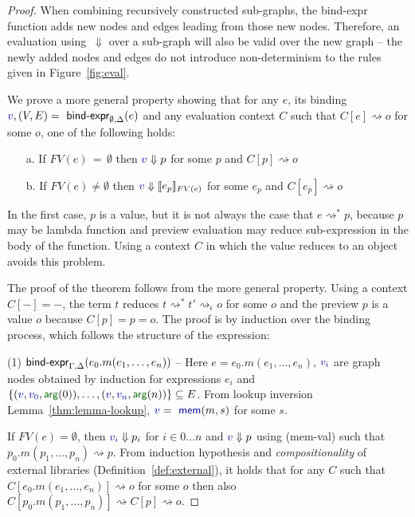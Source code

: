 \documentclass[english,submission]{programming}
\theoremstyle{plain}
\theoremstyle{definition}
\newcommand{\ident}[1]{\textnormal{\textcolor{idclr}{\sffamily #1}}}
\newcommand{\bndclr}[1]{\textcolor{kvdclr}{#1}}
\newcommand{\bnd}[1]{\textnormal{\textcolor{kvdclr}{\sffamily #1}}}
\newcommand{\blbl}[1]{\textnormal{\textcolor{numclr}{\sffamily #1}}}
\newcommand{\rname}[1]{{\sffamily(#1)}}
\begin{document}
\begin{proof}
When combining recursively constructed sub-graphs, the \ident{bind-expr} function
adds new nodes and edges leading from those new nodes. Therefore, an evaluation using~$\Downarrow$
over a sub-graph will also be valid over the new graph -- the newly added nodes and edges do not introduce
non-determinism to the rules given in Figure~\ref{fig:eval}.

We prove a more general property showing that for any $e$, its binding
$\bndclr{v}, (V, E) = \ident{bind-expr}_{\emptyset, \Delta}(e)$ and any evaluation context $C$
such that $C[e]\rightsquigarrow o$ for some $o$, one of the following holds:
%
\begin{enumerate}
\item[a.] If $FV(e)\,=\,\emptyset$ then $\bndclr{v} \Downarrow p$ for some $p$ and $C[p] \rightsquigarrow o$
\item[b.] If $FV(e)\neq\emptyset$ then $\bndclr{v} \Downarrow \llbracket e_p \rrbracket_{FV(e)}$ for some $e_p$ and $C[e_p] \rightsquigarrow o$
\end{enumerate}
%
In the first case, $p$ is a value, but it is not always the case that $e \rightsquigarrow^{*} p$,
because $p$ may be lambda function and preview evaluation may reduce sub-expression in the body of
the function. Using a context $C$ in which the value reduces to an object avoids this problem.

The proof of the theorem follows from the more general property. Using a context $C[-]=-$, the
term $t$ reduces $t \rightsquigarrow^{*}t' \rightsquigarrow_\epsilon o$ for some $o$ and the
preview $p$ is a value $o$ because $C[p] = p = o$.
The proof is by induction over the binding process, which follows the structure of the expression:

\vspace{0.75em}\noindent(1) $\ident{bind-expr}_{\Gamma, \Delta}(e_0.m(e_1, \ldots, e_n))$ --
  Here $e = e_0.m(e_1, \ldots, e_n)$, $\bndclr{v_i}$ are graph nodes obtained by induction for
  expressions $e_i$ and $\{ (\bndclr{v}, \bndclr{v_0}, \blbl{arg}(0)), \ldots, (\bndclr{v}, \bndclr{v_n}, \blbl{arg}(n))\} \subseteq E$.
  From lookup inversion Lemma~\ref{thm:lemma-lookup}, $\bndclr{v} = \bnd{mem}(m, s)$ for some $s$.

  If $FV(e)=\emptyset$, then $\bndclr{v_i} \Downarrow p_i$ for $i\in 0\ldots n$ and
  $\bndclr{v}\Downarrow p$ using \rname{mem-val} such that $p_0.m(p_1, \ldots, p_n) \rightsquigarrow p$.
  From induction hypothesis and \emph{compositionality} of external libraries (Definition~\ref{def:external}),
  it holds that for any $C$ such that $C[e_0.m(e_1, \ldots, e_n)] \rightsquigarrow o$ for some $o$
  then also $C[p_0.m(p_1, \ldots, p_n)] \rightsquigarrow C[p] \rightsquigarrow o$.


\end{proof}
\end{document}
